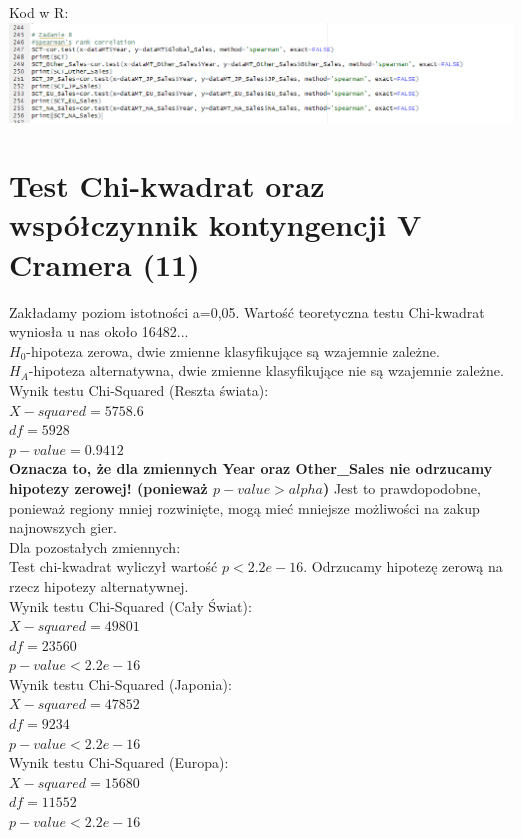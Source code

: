 \documentclass[12pt]{article}
\begin{document}
	Kod w R:\\
	\includegraphics[scale=0.5]{Zad8}
	
	\section{Test Chi-kwadrat oraz współczynnik kontyngencji V Cramera (11)}
Zakładamy poziom istotności a=0,05.
Wartość teoretyczna testu Chi-kwadrat wyniosła u nas około 16482... \\ 
	\(H_0\)-hipoteza zerowa, dwie zmienne klasyfikujące są wzajemnie zależne.\\
	\(H_A\)-hipoteza alternatywna, dwie zmienne klasyfikujące nie są wzajemnie zależne.\\
	Wynik testu Chi-Squared (Reszta świata):\\
	\(X-squared = 5758.6\)\\
	\(df=5928\)\\
	\(p-value =0.9412\)\\
{\color{red}\textbf{Oznacza to, że dla zmiennych Year oraz Other\_Sales nie odrzucamy hipotezy zerowej! (ponieważ \(p-value>alpha\))} }
Jest to prawdopodobne, ponieważ regiony mniej rozwinięte, mogą mieć mniejsze możliwości na zakup najnowszych gier.\\
Dla pozostałych zmiennych:\\
Test chi-kwadrat wyliczył wartość \(p<2.2e-16\). Odrzucamy hipotezę zerową na rzecz hipotezy alternatywnej. \\
	Wynik testu Chi-Squared (Cały Świat):\\
	\(X-squared = 49801\)\\
	\(df=23560\)\\
	\(p-value < 2.2e-16\)\\
	Wynik testu Chi-Squared (Japonia):\\
	\(X-squared = 47852\)\\
	\(df=9234\)\\
	\(p-value < 2.2e-16\)\\
	Wynik testu Chi-Squared (Europa):\\
	\(X-squared = 15680\)\\
	\(df=11552\)\\
	\(p-value < 2.2e-16\)\\
\end{document}
